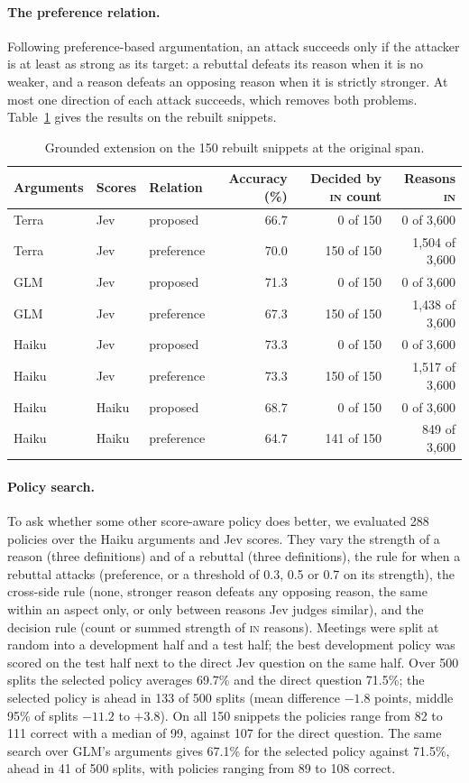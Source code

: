\documentclass[11pt]{article}
\begin{document}
\paragraph{The preference relation.}
Following preference-based argumentation, an attack succeeds only if the attacker is at least as strong as its target: a rebuttal defeats its reason when it is no weaker, and a reason defeats an opposing reason when it is strictly stronger.
At most one direction of each attack succeeds, which removes both problems.
Table~\ref{tab:grounded} gives the results on the rebuilt snippets.

\begin{table}[h]
\centering\small
\begin{tabular}{lllrrr}
\toprule
Arguments & Scores & Relation & Accuracy (\%) & Decided by \textsc{in} count & Reasons \textsc{in} \\
\midrule
Terra & Jev & proposed & 66.7 & 0 of 150 & 0 of 3,600 \\
Terra & Jev & preference & 70.0 & 150 of 150 & 1,504 of 3,600 \\
GLM & Jev & proposed & 71.3 & 0 of 150 & 0 of 3,600 \\
GLM & Jev & preference & 67.3 & 150 of 150 & 1,438 of 3,600 \\
Haiku & Jev & proposed & 73.3 & 0 of 150 & 0 of 3,600 \\
Haiku & Jev & preference & 73.3 & 150 of 150 & 1,517 of 3,600 \\
Haiku & Haiku & proposed & 68.7 & 0 of 150 & 0 of 3,600 \\
Haiku & Haiku & preference & 64.7 & 141 of 150 & 849 of 3,600 \\
\bottomrule
\end{tabular}
\caption{Grounded extension on the 150 rebuilt snippets at the original span.}
\label{tab:grounded}
\end{table}

\paragraph{Policy search.}
To ask whether some other score-aware policy does better, we evaluated 288 policies over the Haiku arguments and Jev scores.
They vary the strength of a reason (three definitions) and of a rebuttal (three definitions), the rule for when a rebuttal attacks (preference, or a threshold of 0.3, 0.5 or 0.7 on its strength), the cross-side rule (none, stronger reason defeats any opposing reason, the same within an aspect only, or only between reasons Jev judges similar), and the decision rule (count or summed strength of \textsc{in} reasons).
Meetings were split at random into a development half and a test half; the best development policy was scored on the test half next to the direct Jev question on the same half.
Over 500 splits the selected policy averages 69.7\% and the direct question 71.5\%; the selected policy is ahead in 133 of 500 splits (mean difference $-1.8$ points, middle 95\% of splits $-11.2$ to $+3.8$).
On all 150 snippets the policies range from 82 to 111 correct with a median of 99, against 107 for the direct question.
The same search over GLM's arguments gives 67.1\% for the selected policy against 71.5\%, ahead in 41 of 500 splits, with policies ranging from 89 to 108 correct.
\end{document}
